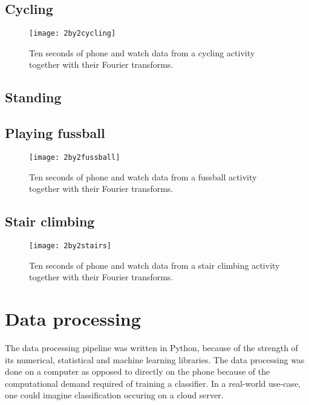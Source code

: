     \subsection{Cycling}
      \begin{figure}
        \centering
        \texttt{[image: 2by2cycling]}
        \caption{Ten seconds of phone and watch data from a cycling activity together with their Fourier transforms.}
        \label{fig:2by2cycling}
      \end{figure}
    \subsection{Standing}
    \subsection{Playing fussball}
      \begin{figure}
        \centering
        \texttt{[image: 2by2fussball]}
        \caption{Ten seconds of phone and watch data from a fussball activity together with their Fourier transforms.}
        \label{fig:2by2fussball}
      \end{figure}
    \subsection{Stair climbing}
      \begin{figure}
        \centering
        \texttt{[image: 2by2stairs]}
        \caption{Ten seconds of phone and watch data from a stair climbing activity together with their Fourier transforms.}
        \label{fig:2by2stairs}
      \end{figure}
  \section{Data processing}
    The data processing pipeline was written in Python, because of the strength of its numerical, statistical and machine learning libraries. The data processing was done on a computer as opposed to directly on the phone because of the computational demand required of training a classifier. In a real-world use-case, one could imagine classification occuring on a cloud server.
